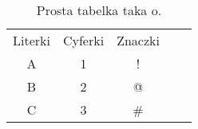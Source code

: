 \begin{table}[h]
\begin{tabular}{|c|c|c|ll}
\cline{1-3}
\cellcolor[HTML]{6200C9}Literki & \cellcolor[HTML]{6200C9}Cyferki & \cellcolor[HTML]{6200C9}Znaczki &  &  \\ \cline{1-3}
A & 1 & !  &  &  \\
B & 2 & @  &  &  \\
C & 3 & \# &  &  \\ \cline{1-3}
\end{tabular}
\centering
\label{tab:mmichalek_tab}
\caption{Prosta tabelka taka o.}
\end{table}